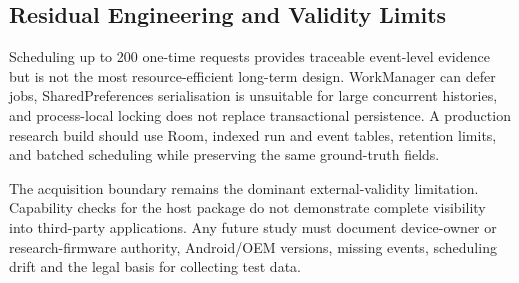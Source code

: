 
\subsection{Residual Engineering and Validity Limits}

Scheduling up to 200 one-time requests provides traceable event-level evidence but is not the most resource-efficient long-term design. WorkManager can defer jobs, SharedPreferences serialisation is unsuitable for large concurrent histories, and process-local locking does not replace transactional persistence. A production research build should use Room, indexed run and event tables, retention limits, and batched scheduling while preserving the same ground-truth fields.

The acquisition boundary remains the dominant external-validity limitation. Capability checks for the host package do not demonstrate complete visibility into third-party applications. Any future study must document device-owner or research-firmware authority, Android/OEM versions, missing events, scheduling drift and the legal basis for collecting test data.
